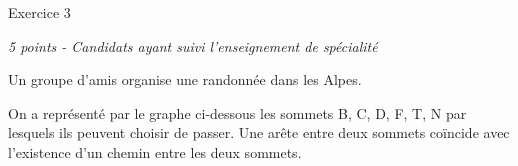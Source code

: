 
%
\begin{h2}Exercice 3\end{h2}
\par
\textit{5 points - Candidats ayant suivi l'enseignement de spécialité}
\par
Un groupe d'amis organise une randonnée dans les Alpes.
\par
On a représenté par le graphe ci-dessous les sommets B, C, D, F, T, N par lesquels ils peuvent choisir de passer. Une arête entre deux sommets coïncide avec l'existence d'un chemin entre les deux sommets.

\begin{center}
\end{center}


